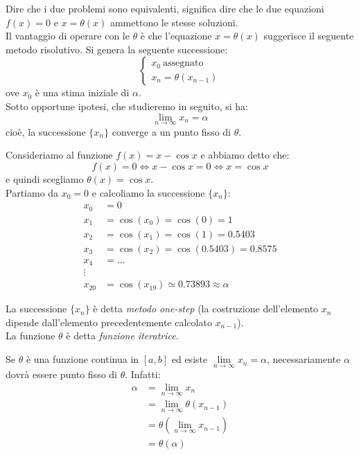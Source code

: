 \documentclass[12pt]{report}
\begin{document}
Dire che i due problemi sono equivalenti, significa dire che le due equazioni $f(x) = 0$ e $x = \theta(x)$ ammettono le stesse soluzioni. \\
Il vantaggio di operare con le $\theta$ è che l'equazione $x = \theta(x)$ suggerisce il seguente metodo risolutivo. Si genera la seguente successione:
\[
\begin{cases}
	x_0\ \text{assegnato} \\
	x_n = \theta(x_{n-1})
\end{cases}
\]
ove $x_0$ è una stima iniziale di $\alpha$. \\
Sotto opportune ipotesi, che studieremo in seguito, si ha:
\[
\lim\limits_{n \to \infty} x_n = \alpha
\]
cioè, la successione $\{x_n\}$ converge a un punto fisso di $\theta$.
\begin{example}{}{}
	Consideriamo al funzione $f(x) = x - \cos x$ e abbiamo detto che:
	\[
	f(x) = 0 \iff x - \cos x = 0 \iff x = \cos x
	\]
	e quindi scegliamo $\theta(x) = \cos x$. \\
	Partiamo da $x_0 = 0$ e calcoliamo la successione $\{x_n\}$:
	\begin{align*}
		x_0 &= 0 \\
		x_1 &= \cos(x_0) = \cos(0) = 1 \\
		x_2 &= \cos(x_1) = \cos(1) = 0.5403 \\
		x_3 &= \cos(x_2) = \cos(0.5403) = 0.8575 \\
		x_4 &= \dots \\
		\vdots \\
		x_{20} &= \cos(x_{19}) \simeq 0.73893 \approx \alpha
	\end{align*}
\end{example}
La successione $\{x_n\}$ è detta \textit{metodo one-step} (la costruzione dell'elemento $x_n$ dipende dall'elemento precedentemente calcolato $x_{n-1}$). \\
La funzione $\theta$ è detta \textit{funzione iteratrice}.
\begin{note}{}{}
	Se $\theta$ è una funzione continua in $[a, b]$ ed esiste $\lim\limits_{n\to\infty}x_n = \alpha$, necessariamente $\alpha$ dovrà essere punto fisso di $\theta$. Infatti:
	\begin{align*}
		\alpha &= \lim\limits_{n\to\infty}x_n\\
		&= \lim\limits_{n\to\infty}\theta(x_{n-1}) \\
		&= \theta(\lim\limits_{n\to\infty}x_{n-1}) \\
		&= \theta(\alpha)
	\end{align*}
\end{note}
\end{document}
